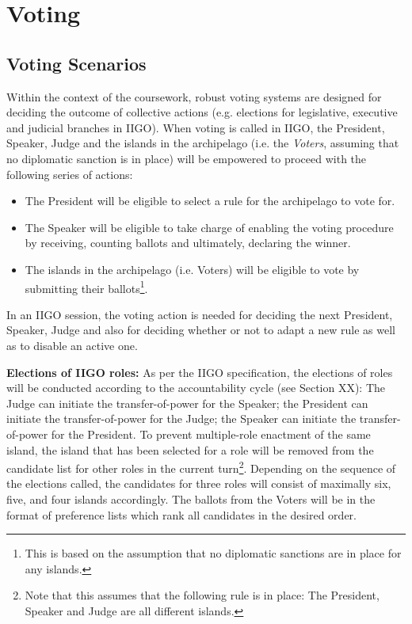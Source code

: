 \chapter{Voting}
\section{Voting Scenarios}
\label{sec:VotingScenarios}

Within the context of the coursework, robust voting systems are designed for deciding the outcome of collective actions (e.g. elections for legislative, executive and judicial branches in IIGO).
When voting is called in IIGO, the President, Speaker, Judge and the islands in the archipelago (i.e. the \emph{Voters}, assuming that no diplomatic sanction is in place) will be empowered to proceed with the following series of actions:
\begin{itemize}
    \item The President will be eligible to select a rule for the archipelago to vote for.
    \item The Speaker will be eligible to take charge of enabling the voting procedure by receiving, counting ballots and ultimately, declaring the winner.
    \item The islands in the archipelago (i.e. Voters) will be eligible to vote by submitting their ballots\footnote{This is based on the assumption that no diplomatic sanctions are in place for any islands.}.
\end{itemize}

In an IIGO session, the voting action is needed for deciding the next President, Speaker, Judge and also for deciding whether or not to adapt a new rule as well as to disable an active one.

\textbf{Elections of IIGO roles:} As per the IIGO specification, the elections of roles will be conducted according to the accountability cycle (see Section XX): The Judge can initiate the transfer-of-power for the Speaker; the President can initiate the transfer-of-power for the Judge; the Speaker can initiate the transfer-of-power for the President. To prevent multiple-role enactment of the same island, the island that has been selected for a role will be removed from the candidate list for other roles in the current turn\footnote{Note that this assumes that the following rule is in place: The President, Speaker and Judge are all different islands.}. Depending on the sequence of the elections called, the candidates for three roles will consist of maximally six, five, and four islands accordingly. The ballots from the Voters will be in the format of preference lists which rank all candidates in the desired order.

